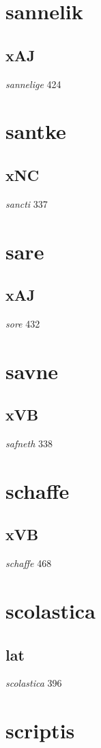 \documentclass[a4paper,twocolumn]{article}
\begin{document}
\section{sannelik}
\label{sec:org3cdac5b}
\subsection{xAJ}
\label{sec:orgeac2814}
\emph{sannelige} 424 
\section{santke}
\label{sec:org323a91b}
\subsection{xNC}
\label{sec:org51db2db}
\emph{sancti} 337 
\section{sare}
\label{sec:org06cde92}
\subsection{xAJ}
\label{sec:orgd3feb45}
\emph{sore} 432 
\section{savne}
\label{sec:org544944f}
\subsection{xVB}
\label{sec:org0d74ed5}
\emph{safneth} 338 
\section{schaffe}
\label{sec:org01da7ce}
\subsection{xVB}
\label{sec:orgf0dce56}
\emph{schaffe} 468 
\section{scolastica}
\label{sec:org457b101}
\subsection{lat}
\label{sec:org2ebab95}
\emph{scolastica} 396 
\section{scriptis}
\label{sec:orgaa852e4}
\end{document}
